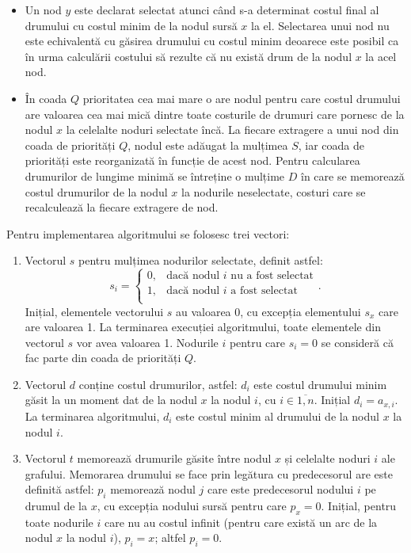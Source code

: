 \documentclass[9pt,a4paper]{report}
\begin{document}
\begin{itemize}
    \item Un nod $y$ este declarat selectat atunci când s-a determinat costul final al drumului cu costul minim de la nodul sursă $x$ la el. Selectarea unui nod nu este echivalentă cu găsirea drumului cu costul minim deoarece este posibil ca în urma calculării costului să rezulte că nu există drum de la nodul $x$ la acel nod.
    \item În coada $Q$ prioritatea cea mai mare o are nodul pentru care costul drumului are valoarea cea mai mică dintre toate costurile de drumuri care pornesc de la nodul $x$ la celelalte noduri selectate încă. La fiecare extragere a unui nod din coada de priorități $Q$, nodul este adăugat la mulțimea $S$, iar coada de priorități este reorganizată în funcție de acest nod. Pentru calcularea drumurilor de lungime minimă se întreține o mulțime $D$ în care se memorează costul drumurilor de la nodul $x$ la nodurile neselectate, costuri care se recalculează la fiecare extragere de nod.
\end{itemize}

Pentru implementarea algoritmului se folosesc trei vectori:
\begin{enumerate}
    \item Vectorul $s$ pentru mulțimea nodurilor selectate, definit astfel: 
    $$
        s_{i} =
        \begin{cases}
            0, & \text{dacă nodul } i \text{ nu a fost selectat} \\
            1, & \text{dacă nodul } i \text{ a fost selectat} \\
        \end{cases}.
    $$ Inițial, elementele vectorului $s$ au valoarea 0, cu excepția elementului $s_x$ care are valoarea 1. La terminarea execuției algoritmului, toate elementele din vectorul $s$ vor avea valoarea 1. Nodurile $i$ pentru care $s_i = 0$ se consideră că fac parte din coada de priorități $Q$.
    \item Vectorul $d$ conține costul drumurilor, astfel: $d_i$ este costul drumului minim găsit la un moment dat de la nodul $x$ la nodul $i$, cu $i \in \overline{1, n}$. Inițial $d_i = a_{x,i}$. La terminarea algoritmului, $d_{i}$ este costul minim al drumului de la nodul $x$ la nodul $i$.
    \item Vectorul $t$ memorează drumurile găsite între nodul $x$ și celelalte noduri $i$ ale grafului. Memorarea drumului se face prin legătura cu predecesorul are este definită astfel: $p_i$ memorează nodul $j$ care este predecesorul nodului $i$ pe drumul de la $x$, cu excepția nodului sursă pentru care $p_x = 0$. Inițial, pentru toate nodurile $i$ care nu au costul infinit (pentru care există un arc de la nodul $x$ la nodul $i$), $p_i = x$; altfel $p_i = 0$.
\end{enumerate}
\end{document}
